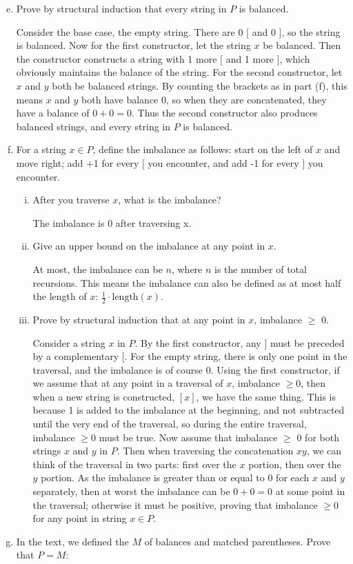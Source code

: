 \documentclass{article}
\begin{document}
\begin{enumerate}[(a)]\setcounter{enumi}{4}
  \item Prove by structural induction that every string in $P$ is balanced.

    Consider the base case, the empty string. There are 0 $[$ and 0 $]$, so the string is balanced. Now for the first constructor, let the string $x$ be balanced. Then the constructor constructs a string with 1 more $[$ and 1 more $]$, which obviously maintains the balance of the string. For the second constructor, let $x$ and $y$ both be balanced strings. By counting the brackets as in part (f), this means $x$ and $y$ both have balance 0, so when they are concatenated, they have a balance of $0 + 0 = 0$. Thus the second constructor also produces balanced strings, and every string in $P$ is balanced.
  \item For a string $x \in P$, define the imbalance as follows: start on the left of $x$ and move right; add +1 for every $[$ you encounter, and add -1 for every $]$ you encounter.
  \begin{enumerate}[(i)]
    \item After you traverse $x$, what is the imbalance?

      The imbalance is $0$ after traversing x.
    \item Give an upper bound on the imbalance at any point in $x$.

      At most, the imbalance can be $n$, where $n$ is the number of total recursions. This means the imbalance can also be defined as at most half the length of $x$: $\frac{1}{2} \cdot \text{length}(x)$.
    \item Prove by structural induction that at any point in $x$, imbalance $\geq$ 0.

      Consider a string $x$ in $P$. By the first constructor, any $]$ must be preceded by a complementary $[$. For the empty string, there is only one point in the traversal, and the imbalance is of course 0. Using the first constructor, if we assume that at any point in a traversal of $x$, imbalance $\geq 0$, then when a new string is constructed, $[x]$, we have the same thing. This is because 1 is added to the imbalance at the beginning, and not subtracted until the very end of the traversal, so during the entire traversal, imbalance $\geq 0$ must be true. Now assume that imbalance $\geq$ 0 for both strings $x$ and $y$ in $P$. Then when traversing the concatenation $xy$, we can think of the traversal in two parts: first over the $x$ portion, then over the $y$ portion. As the imbalance is greater than or equal to 0 for each $x$ and $y$ separately, then at worst the imbalance can be $0 + 0 = 0$ at some point in the traversal; otherwise it must be positive, proving that imbalance $\geq 0$ for any point in string $x \in P$.
  \end{enumerate}
  \item In the text, we defined the $M$ of balances and matched parentheses. Prove that $P = M$:


\end{enumerate}
\end{document}
